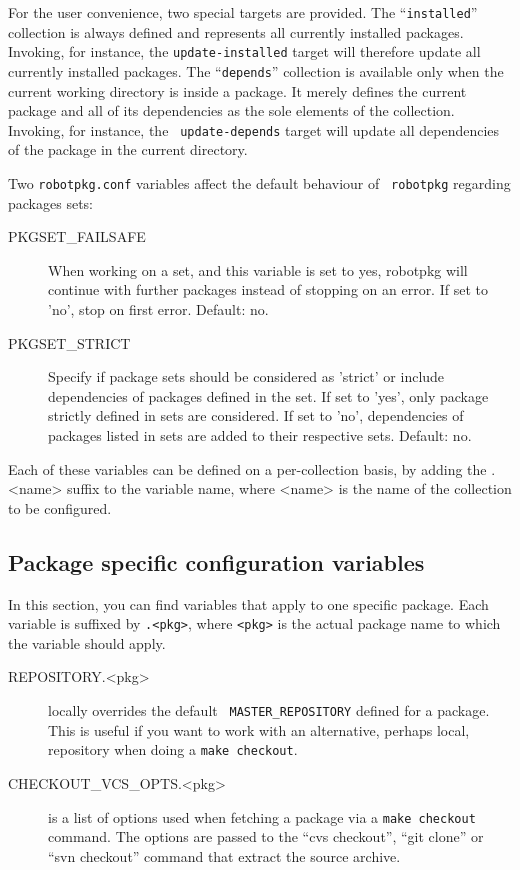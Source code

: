 For  the  user convenience,  two  special  targets  are provided.   The
 ``{\tt installed}'' collection is always defined and represents all currently
installed packages.  Invoking, for  instance, the {\tt update-installed} target
will therefore update all  currently installed packages.  The ``{\tt depends}''
collection is  available only  when the current  working directory is  inside a
package. It merely  defines the current package and all  of its dependencies as
the  sole  elements  of  the  collection.  Invoking,  for  instance,  the  {\tt
update-depends}  target will  update all  dependencies  of the  package in  the
current directory.

Two {\tt robotpkg.conf} variables affect the default behaviour of {\tt
robotpkg} regarding packages sets:

\begin{description}
   \item[PKGSET\_FAILSAFE] When working on a set, and this variable is set to
   yes, robotpkg will continue with further packages instead of stopping on an
   error. If set to 'no', stop on first error. Default: no.

   \item[PKGSET\_STRICT] Specify if package sets should be considered as
   'strict' or include dependencies of packages defined in the set. If set to
   'yes', only package strictly defined in sets are considered. If set to 'no',
   dependencies of packages listed in sets are added to their respective
   sets. Default: no.
\end{description}

Each of these variables can be defined on a per-collection basis, by adding the
.<name> suffix to the variable name, where <name> is the name of the collection
to be configured.


\subsection{Package specific configuration variables} %

In this  section, you can  find variables that  apply to one  specific package.
Each  variable is  suffixed by  {\tt.<pkg>}, where  {\tt <pkg>}  is  the actual
package name to which the variable should apply.

\begin{description}
   \item[REPOSITORY.<pkg>] locally overrides the default {\tt
   MASTER\_REPOSITORY} defined for a package. This is useful if you want to
   work with an alternative, perhaps local, repository when doing a {\tt make
   checkout}.

   \item[CHECKOUT\_VCS\_OPTS.<pkg>] is a list of options used when fetching a
   package via a {\tt make checkout} command. The options are passed to the
   ``cvs checkout'', ``git clone'' or ``svn checkout'' command that extract the
   source archive.
\end{description}


